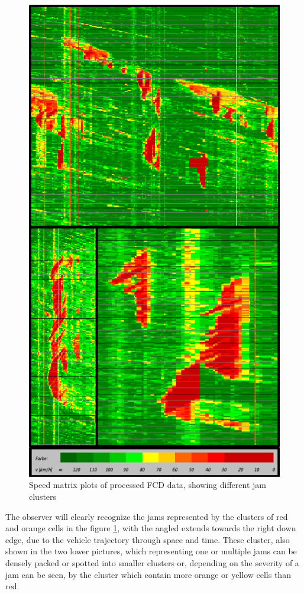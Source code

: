 \documentclass[a4paper,12pt]{report}
\begin{document}
\begin{figure}[h]
	\centering
	\includegraphics[scale=0.8]{./assets/SpeedMatrixPlot_mutiple}
	\caption{Speed matrix plots of processed FCD data, showing different jam clusters}
	\label{img:speedMatrixPlot_mutipleMixedClusters}
\end{figure}

The observer will clearly recognize the jams represented by the clusters of red and orange cells in the figure \ref{img:speedMatrixPlot_mutipleMixedClusters}, with the angled extends towards the right down edge, due to the vehicle trajectory through space and time. These cluster, also shown in the two lower pictures, which representing one or multiple jams can be densely packed or spotted into smaller clusters or, depending on the severity of a jam can be seen, by the cluster which contain more orange or yellow cells than red. 
\end{document}
